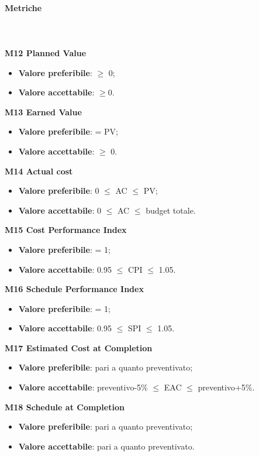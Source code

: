 			\paragraph{Metriche} \mbox{} \\ \\
			\textbf{M12 Planned Value}
			\begin{itemize}
				\item \textbf{Valore preferibile}: $\ge$ 0;
				\item \textbf{Valore accettabile}: $\ge$0.
			\end{itemize}
			\textbf{M13 Earned Value}
			\begin{itemize}
				\item \textbf{Valore preferibile}: = PV;
				\item \textbf{Valore accettabile}: $\ge$ 0.
			\end{itemize}
			\textbf{M14 Actual cost}
			\begin{itemize}
				\item \textbf{Valore preferibile}: 0 $\le$ AC $\le$ PV;
				\item \textbf{Valore accettabile}: 0 $\le$ AC $\le$ budget totale.
			\end{itemize}
			\textbf{M15 Cost Performance Index}
			\begin{itemize}
				\item \textbf{Valore preferibile}: = 1;
				\item \textbf{Valore accettabile}: 0.95 $\le$ CPI $\le$ 1.05.
			\end{itemize}
			\textbf{M16 Schedule Performance Index}
			\begin{itemize}
				\item \textbf{Valore preferibile}: = 1;
				\item \textbf{Valore accettabile}: 0.95 $\le$ SPI $\le$ 1.05.
			\end{itemize}
			\textbf{M17 Estimated Cost at Completion}
			\begin{itemize}
				\item \textbf{Valore preferibile}: pari a quanto preventivato;
				\item \textbf{Valore accettabile}: preventivo-5\% $\le$ EAC $\le$ preventivo+5\%.
			\end{itemize}
			\textbf{M18 Schedule at Completion}
			\begin{itemize}
				\item \textbf{Valore preferibile}: pari a quanto preventivato;
				\item \textbf{Valore accettabile}: pari a quanto preventivato.
			\end{itemize}

